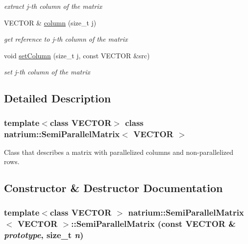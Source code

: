 \begin{DoxyCompactItemize}
\begin{DoxyCompactList}\small\item\em extract j-\/th column of the matrix \item\end{DoxyCompactList}\item 
VECTOR \& \hyperlink{classnatrium_1_1SemiParallelMatrix_ae9deace949ec09098404defd48f78ccc}{column} (size\_\-t j)
\begin{DoxyCompactList}\small\item\em get reference to j-\/th column of the matrix \item\end{DoxyCompactList}\item 
void \hyperlink{classnatrium_1_1SemiParallelMatrix_a240c0cfc6958a66f49edc7ce205664c8}{setColumn} (size\_\-t j, const VECTOR \&src)
\begin{DoxyCompactList}\small\item\em set j-\/th column of the matrix \item\end{DoxyCompactList}\end{DoxyCompactItemize}


\subsection{Detailed Description}
\subsubsection*{template$<$class VECTOR$>$ class natrium::SemiParallelMatrix$<$ VECTOR $>$}

Class that describes a matrix with parallelized columns and non-\/parallelized rows. 

\subsection{Constructor \& Destructor Documentation}
\hypertarget{classnatrium_1_1SemiParallelMatrix_a6c8fff84bcf91369e0323eb0a762fd65}{
\subsubsection[{SemiParallelMatrix}]{\setlength{\rightskip}{0pt plus 5cm}template$<$class VECTOR $>$ {\bf natrium::SemiParallelMatrix}$<$ VECTOR $>$::{\bf SemiParallelMatrix} (const VECTOR \& {\em prototype}, \/  size\_\-t {\em n})}}
\label{classnatrium_1_1SemiParallelMatrix_a6c8fff84bcf91369e0323eb0a762fd65}


